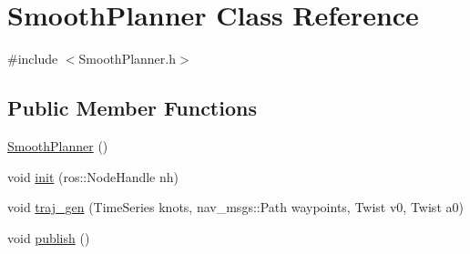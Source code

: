 \hypertarget{class_smooth_planner}{}\section{Smooth\+Planner Class Reference}
\label{class_smooth_planner}


{\ttfamily \#include $<$Smooth\+Planner.\+h$>$}

\subsection*{Public Member Functions}
\begin{DoxyCompactItemize}
\item 
\hyperlink{class_smooth_planner_a84977f10ce3e96fac997076324ca2909}{Smooth\+Planner} ()
\item 
void \hyperlink{class_smooth_planner_a34508c873d458075880afbae0e9c933e}{init} (ros\+::\+Node\+Handle nh)
\item 
void \hyperlink{class_smooth_planner_afc03abbd5f6473f2bc952f70195326ac}{traj\+\_\+gen} (Time\+Series knots, nav\+\_\+msgs\+::\+Path waypoints, Twist v0, Twist a0)
\item 
void \hyperlink{class_smooth_planner_a2996c73522e93adff70eb68e18c55951}{publish} ()
\end{DoxyCompactItemize}
